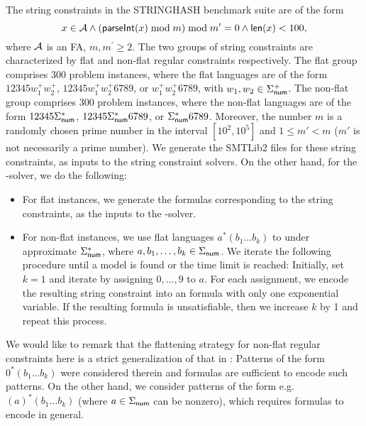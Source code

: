 The string constraints in the STRINGHASH benchmark suite are of the form 
$$x \in \mathcal{A} \wedge \left( \textsf{parseInt}(x) \bmod m \right) \bmod m^\prime = 0   \notag \wedge \textsf{len}(x) < 100,$$ 
where $\mathcal{A}$ is an FA, $m, m^\prime \ge 2.$ 
The two groups of string constraints are characterized by flat and non-flat regular constraints respectively.
The flat group comprises 300 problem instances, where the flat languages are of the form $12345w^+_1 w^+_2$,  $12345 w^+_1  w^+_2 6789$, or $w^+_1 w^+_2 6789$, with $w_1,w_2 \in \Sigma^+_{\sf num}$. The non-flat group comprises 300 problem instances, where the non-flat languages are of the form $12345\Sigma_{\sf num}^*$, $12345\Sigma_{\sf num}^* 6789$, or $\Sigma_{\sf num}^* 6789$. Moreover, the number $m$ is a randomly chosen prime number in the interval $[10^2, 10^5]$ and $1 \le m' < m$ ($m'$ is not necessarily a prime number). We generate the SMTLib2 files for these string constraints, as inputs to the string constraint solvers. On the other hand, for the {\paexp}-solver, we do the following:   
\begin{itemize}
\item For flat instances, we generate the {\paexp} formulas corresponding to the string constraints, as the inputs to the {\paexp}-solver.
%
\item For non-flat instances, we use flat languages $a^* (b_{1} \ldots b_{k})$ to under approximate 
$\Sigma_{\sf num}^*$,  where $a, b_1,\ldots, b_k \in \Sigma_{\sf num}$. 
%
%
We iterate the following procedure until a model is found or the time limit is reached: Initially, set $k=1$ and iterate by assigning $0, \ldots, 9$ to $a$. For each assignment, we encode the resulting string constraint into an {\paexp} formula with only one exponential variable. If the resulting {\paexp} formula is unsatisfiable, then we increase $k$ by 1 and repeat this process. 
\end{itemize}
We would like to remark that the flattening strategy for non-flat regular constraints here is a strict generalization of that in \cite{Parosh:20:PLDI}: Patterns of the form $0^*(b_1...b_k)$ were considered therein and {\pa} formulas are sufficient to encode such patterns. On the other hand, we consider patterns of the form e.g. $(a)^* (b_1 \ldots b_k)$ (where $a \in \Sigma_{\sf num}$ can be nonzero), which requires {\paexp} formulas to encode in general.

